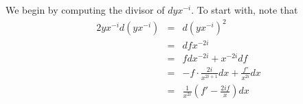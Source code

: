 \documentclass[draft, 11pt]{article} %
\theoremstyle{plain}
\theoremstyle{remark}
\DeclareMathOperator{\di}{div}
\begin{document}
\begin{comment}
We can, of course, rewrite $d(yx^{-i})$ as $ydx^{-i} + x^{-i}dy$.
We will start by studying these two divisors, and use them to find an appropriate $\omega_1$ and $\omega_2$.

We first consider $x^{-i}dy$.
Now $ dy = \frac{f'}{y}dx$, so \begin{eqnarray*} \di (dy) & = & \di(f') - \di (y) + \di (dx) \\ & = & \di(f') - (R - (2g+2)[P_\infty]) + (R - 4[P_\infty])\\  & = & \di(f') +(2g-2)[P_\infty].\end{eqnarray*}
Note that we use the Hurwitz formula to compute the divisor of $dx$.
So \begin{eqnarray} \di(x^{-i}dy) & = &  \di(f') -2i[P_0] + (2i +2g-2)P_{\infty} \\ & = & \di_0(f') - 2i[P_0] + (2i-2)[P_\infty]. \end{eqnarray}

We now consider $ydx^{-i}$.
Firstly, \[ y dx^{-i} = y\cdot \frac{i}{x^{i-1}}d\frac{1}{x} = y \cdot \frac{i}{x^{i+1}} dx.\]
Hence \begin{eqnarray*} \di (ydx^{-i}) & = & (R - (2g+2)[P_\infty]) -(2(i+1)[P_0] - 2(i+1)[P_\infty]) + (R - 4[P_\infty]) \\ & = &  2R - 2(i+1)[P_0] + 2(i-g-2)[P_\infty] \\ & = & 2\left ( \sum_{\text{Ramified } P\neq P_0, P_\infty}[P]\right) - 2i[P_0] +2(i-g-1)P_\infty .\end{eqnarray*}
\end{comment}

We begin by computing the divisor of $dyx^{-i}$.
To start with, note that 
\begin{eqnarray*}
2yx^{-i}d(yx^{-i}) & = & d(yx^{-i})^2 \\
& = & dfx^{-2i} \\
& = & fdx^{-2i} + x^{-2i}df \\
& = & -f\cdot\frac{2i}{x^{2i+1}}dx + \frac{f'}{x^{2i}}dx \\
& = & \frac{1}{x^{2i}}\left( f' - \frac{2if}{x}\right) dx 
\end{eqnarray*}
\end{document}
